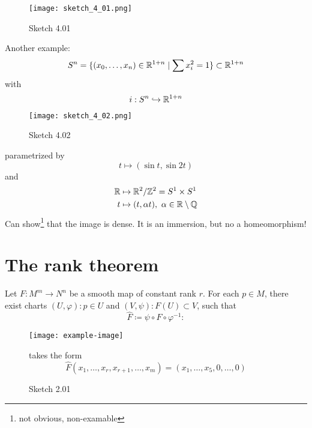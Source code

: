 \begin{example}
    \begin{figure}[H]
        \centering
        \texttt{[image: sketch\_4\_01.png]}
        \caption{Sketch 4.01}
    \end{figure}
    Another example: \[S^n=\{(x_0,\dots,x_n)\in\mathbb{R}^{1+n}\mid\sum x_i^2=1\}\subset\mathbb{R}^{1+n}\]
    with \[i:S^n\hookrightarrow \mathbb{R}^{1+n}\]

    \begin{figure}[H]
        \centering
        \texttt{[image: sketch\_4\_02.png]}
        \caption{Sketch 4.02}
    \end{figure}
    parametrized by \[t\mapsto (\sin t,\sin 2t)\]
    and 
    \begin{align*}
        \mathbb{R}&\mapsto \mathbb{R}^2/\mathbb{Z}^2=S^1\times S^1\\
        t&\mapsto (t,\alpha t),\text{   } \alpha \in\mathbb{R}\setminus \mathbb{Q} 
    \end{align*}
    Can show\footnote{not obvious, non-examable} that the image is dense. It is an immersion, but no a homeomorphism!
\end{example}


\section{The rank theorem}

\begin{theorem}\label{thm:4.3} Let \(F:M^m\to N^n\) be a smooth map of 
    constant rank \(r\). For each \(p\in M\), there exist charts \((U,\varphi):p\in U\) and \((V,\psi):F(U)\subset V\),
    such that \[\hat{F}\coloneqq \psi \circ F\circ\varphi^{-1}:\]
    \begin{figure}[H]
        \centering
        \texttt{[image: example-image]}
        \caption{Sketch 2.01}
        takes the form 
        \[\hat{F}(x_1,\dots,x_r,x_{r+1},\dots,x_m)=(x_1,\dots,x_5,0,\dots,0)\]
    \end{figure} 
    
\end{theorem}

